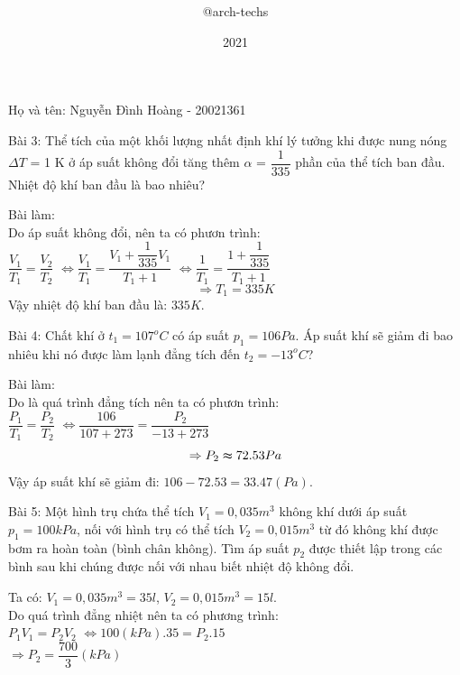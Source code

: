 \documentclass[12pt,a4paper]{report}
\title{\framebox {
        \textcolor{TEcolor}{
            \Huge {    AP/College Physics 1    }
        }
    }    }
\author{\Large @arch-techs}
\date{2021}
\begin{document}
{\selectfont

\begin{center}
    \framebox{
      \Large \textcolor{TEcolor}{BTVN: Chương 5: Nhiệt Động Lực Học Chất Khí }
}
\newline

      \textcolor{TEcolor}{Họ và tên: Nguyễn Đình Hoàng - 20021361}
\end{center}

Bài 3: Thể tích của một khối lượng nhất định khí lý tưởng khi được nung nóng
$\varDelta T$ = 1 K ở áp suất không đổi tăng thêm $\alpha $ = $\dfrac{1}{335}$ phần của thể tích ban đầu.
Nhiệt độ khí ban đầu là bao nhiêu?
\begin{center}
    Bài làm: \\
    Do áp suất không đổi, nên ta có phươn trình: \\
    $\dfrac{V_{1}}{T_{1}} = \dfrac{V_{2}}{T_{2}}$
    $\Leftrightarrow  \dfrac{V_{1}}{T_{1}} = \dfrac{V_{1} + \dfrac{1}{335}V_{1}}{T_{1} + 1}$
    $\Leftrightarrow  \dfrac{1}{T_{1}} = \dfrac{1 + \dfrac{1}{335}}{T_{1} + 1}$
    \[\Rightarrow T_{1} = 335K\] 
    Vậy nhiệt độ khí ban đầu là: $335K$.

\end{center}

Bài 4: Chất khí ở $t_{1} = 107^o C $ có áp suất $p_{1} = 106 Pa.$ Áp suất khí sẽ giảm đi bao
nhiêu khi nó được làm lạnh đẳng tích đến $t_{2} = -13^o C$?
\begin{center}
    Bài làm: \\
    Do là quá trình đẳng tích nên ta có phươn trình: \\
    $\dfrac{P_{1}}{T_{1}} = \dfrac{P_{2}}{T_{2}}$
    $\Leftrightarrow  \dfrac{106}{107 + 273} = \dfrac{P_{2}}{-13 + 273}$
    \[\Rightarrow P_{2} \thickapprox 72.53Pa\] 
    Vậy áp suất khí sẽ giảm đi: $106 - 72.53 = 33.47 (Pa)$.

\end{center}

Bài 5: Một hình trụ chứa thể tích $V_{1} = 0,035 m^3$ không khí dưới áp suất $p_{1} = 100kPa$, nối với hình trụ có thể tích $V_{2} = 0,015 m^3$
từ đó không khí được bơm ra hoàn toàn (bình chân không). Tìm áp suất $p_{2}$ được thiết lập trong các bình sau
khi chúng được nối với nhau biết nhiệt độ không đổi.

\begin{center}
    Ta có: $V_{1} = 0,035 m^3 = 35l$, $V_{2} = 0,015 m^3 = 15l$. \\
    Do quá trình đẳng nhiệt nên ta có phương trình: \\
    $P_{1}V_{1} = P_{2}V_{2}$
    $\Leftrightarrow 100(kPa).35 = P_{2}.15$ \\
    $\Rightarrow P_{2} = \dfrac{700}{3} (kPa)$
\end{center}

}
\end{document}
